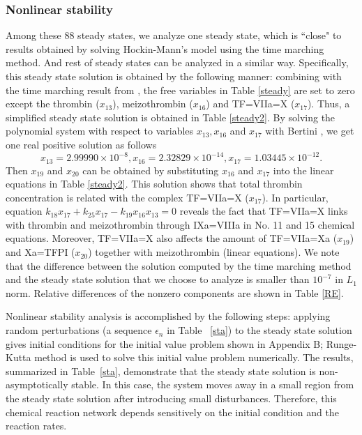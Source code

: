 \subsubsection*{Nonlinear stability}
Among these $88$ steady states, we analyze one steady state, which
is ``close" to results obtained by solving Hockin-Mann's model
\cite{HocJon02} using the time marching method. And rest of steady states can be analyzed in a similar way. Specifically, this
steady state solution is obtained by the following manner: combining
with the time marching result from \cite{HocJon02}, the free
variables in Table \ref{steady} are set to zero except the thrombin
($x_{13}$), meizothrombin ($x_{16}$) and TF=VIIa=X ($x_{17}$). Thus,
a simplified steady state solution is obtained in Table
\ref{steady2}.
By solving the polynomial system with respect to variables
$x_{13},x_{16}$ and $x_{17}$ with Bertini \cite{Bertini}, we get one
real positive solution as follows
\[
x_{13}=2.99990\times10^{-8},x_{16}=2.32829\times10^{-14},
x_{17}=1.03445\times10^{-12}.\] Then $x_{19}$ and $x_{20}$ can be
obtained by substituting $x_{16}$ and $x_{17}$ into the linear
equations in Table \ref{steady2}. This solution shows that total
thrombin concentration is related with the complex TF=VIIa=X
($x_{17}$). In particular, equation
$k_{18}x_{17}+k_{25}x_{17}-k_{19}x_{16}x_{13}=0$ reveals the fact
that TF=VIIa=X links with thrombin and meizothrombin through
IXa=VIIIa in No. 11 and 15 chemical equations. Moreover, TF=VIIa=X
also affects the amount of TF=VIIa=Xa ($x_{19}$) and Xa=TFPI
($x_{20}$) together with meizothrombin (linear equations).  We note that the difference between the solution computed by the
time marching method and the steady state solution that we choose to
analyze is smaller than  $10^{-7}$ in $L_1$ norm. Relative
differences of the nonzero components are shown in  Table \ref{RE}.

Nonlinear stability analysis is accomplished by the following steps:
applying random perturbations (a sequence $\epsilon_n$ in Table
~\ref{sta}) to the steady state solution gives initial conditions
for the initial value problem shown in Appendix B; Runge-Kutta
method is used to solve this initial value problem numerically. The
results, summarized in Table~\ref{sta}, demonstrate that the steady
state solution is non-asymptotically stable. In this case, the
system moves away in a small region from the steady state solution
after introducing small disturbances. Therefore, this chemical
reaction network depends sensitively on the initial condition and
the reaction rates.

